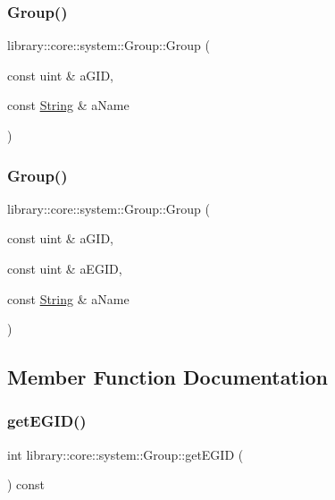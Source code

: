 \subsubsection{\texorpdfstring{Group()}{Group()}\hspace{0.1cm}{\footnotesize\ttfamily [1/2]}}
{\footnotesize\ttfamily library\+::core\+::system\+::\+Group\+::\+Group (\begin{DoxyParamCaption}\item[{const uint \&}]{a\+G\+ID,  }\item[{const \hyperlink{classlibrary_1_1core_1_1types_1_1_string}{String} \&}]{a\+Name }\end{DoxyParamCaption})}

\mbox{\label{classlibrary_1_1core_1_1system_1_1_group_aa6a21b13948d6be0e344503b9e31f3ef}} 
\subsubsection{\texorpdfstring{Group()}{Group()}\hspace{0.1cm}{\footnotesize\ttfamily [2/2]}}
{\footnotesize\ttfamily library\+::core\+::system\+::\+Group\+::\+Group (\begin{DoxyParamCaption}\item[{const uint \&}]{a\+G\+ID,  }\item[{const uint \&}]{a\+E\+G\+ID,  }\item[{const \hyperlink{classlibrary_1_1core_1_1types_1_1_string}{String} \&}]{a\+Name }\end{DoxyParamCaption})}



\subsection{Member Function Documentation}
\mbox{\label{classlibrary_1_1core_1_1system_1_1_group_ab9677f28eb1f6653ad9c5776d1f00c3f}} 
\subsubsection{\texorpdfstring{get\+E\+G\+I\+D()}{getEGID()}}
{\footnotesize\ttfamily int library\+::core\+::system\+::\+Group\+::get\+E\+G\+ID (\begin{DoxyParamCaption}{ }\end{DoxyParamCaption}) const}

